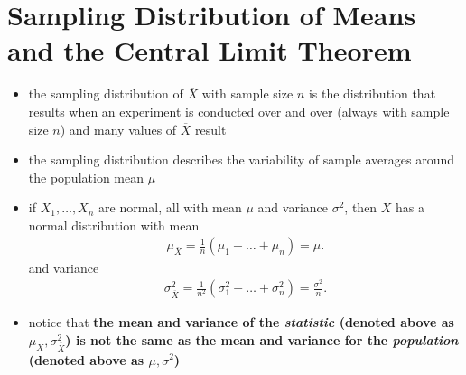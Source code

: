 \documentclass[10pt]{article}
\begin{document}
\section{Sampling Distribution of Means and the Central Limit Theorem}
\begin{itemize}
    \item the sampling distribution of $\overline{X}$ with sample size $n$ is the distribution that results when an experiment is conducted over and over (always with sample size $n$) and many values of $\overline{X}$ result
    \item the sampling distribution describes the variability of sample averages around the population mean $\mu$
    \item if $X_1, \ldots, X_n$ are normal, all with mean $\mu$ and variance $\sigma^2$, then $\overline{X}$ has a normal distribution with mean 
        \begin{gather*}
            \mu_{\overline{X}} = \frac{1}{n}(\mu_1 + \ldots + \mu_n) = \mu
        .\end{gather*}
        and variance 
        \begin{gather*}
            \sigma_{\overline{X}}^2 = \frac{1}{n^2}(\sigma_1^2 + \ldots + \sigma_n^2) = \frac{\sigma^2}{n}
        .\end{gather*}
    \item notice that \textbf{the mean and variance of the \textit{statistic} (denoted above as  $\mu_{\overline{X}}, \sigma_{\overline{X}}^2$) is not the same as the mean and variance for the \textit{population} (denoted above as $\mu, \sigma^2$)}  
\end{itemize}
\end{document}
